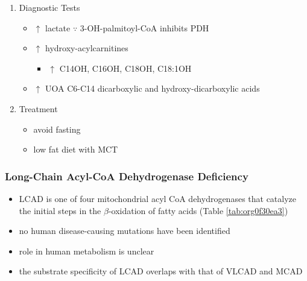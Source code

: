\documentclass{scrartcl}
\begin{document}
\begin{enumerate}
\item Diagnostic Tests
\label{sec:orgf639c4b}
\begin{itemize}
\item \(\uparrow\) lactate \(\because\) 3-OH-palmitoyl-CoA inhibits PDH
\item \(\uparrow\) hydroxy-acylcarnitines
\begin{itemize}
\item \(\uparrow\) C14OH, C16OH, C18OH, C18:1OH
\end{itemize}
\item \(\uparrow\) UOA C6-C14 dicarboxylic and hydroxy-dicarboxylic acids
\end{itemize}

\item Treatment
\label{sec:orgf14e9c3}
\begin{itemize}
\item avoid fasting
\item low fat diet with MCT
\end{itemize}
\end{enumerate}
\subsubsection{Long-Chain Acyl-CoA Dehydrogenase Deficiency}
\label{sec:orgcc90059}
\begin{itemize}
\item LCAD is one of four mitochondrial acyl CoA dehydrogenases that
catalyze the initial steps in the \(\beta\)-oxidation of fatty acids
(Table \ref{tab:org0f30ea3})
\item no human disease-causing mutations have been identified
\item role  in  human  metabolism  is unclear
\item the substrate specificity of LCAD overlaps with that of
VLCAD and MCAD
\end{itemize}
\end{document}
